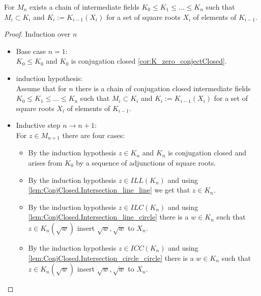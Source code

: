 \begin{lemma}
    \label{lem:Mi_chain}
    \leanok
    For $M_n$ exists a chain of intermediate fields $K_0 \le K_1 \le \ldots \le K_n$ such that $M_i\subset K_i$ and $K_i:= K_{i-1}(X_i)$ for a set of square roots $X_i$ of elements of $K_{i-1}$.
\end{lemma}

\begin{proof}
    \leanok
    Induction over $n$
    \begin{itemize}
        \item Base case $n=1$: \\
            $K_0 \le K_0$ and $K_0$ is conjugation closed \ref{cor:K_zero_conjectClosed}.
        \item induction hypothesis: \\
            Assume that for $n$ there is a chain of conjugation closed  intermediate fields $K_0 \le K_1 \le \ldots \le K_n$ such that $M_i\subset K_i$ and $K_i:= K_{i-1}(X_i)$ for a set of square roots $X_i$ of elements of $K_{i-1}$.
        \item Inductive step $n \to n+1$: \\
            For $z\in M_{n+1}$ there are four cases: 
            \begin{itemize}
                \item [$z \in M_n$:] By the induction hypothesis $z \in K_n$ and $K_n$ is conjugation closed and arises from $K_0$ by a sequence of adjunctions of square roots.
                \item [$z \in ILL (M_n)$:] By the induction hypothesis $z \in ILL (K_n)$ and using \ref{lem:ConjClosed.Intersection_line_line} we get that $z \in K_{n}$.
                \item [$z \in ILC (M_n)$:] By the induction hypothesis $z \in ILC (K_n)$ and using \ref{lem:ConjClosed.Intersection_line_circle} there is a $w \in K_n$ such that $z \in K_n(\sqrt{w})$ insert  $\sqrt{w}, \overline{\sqrt{w}}$ to $X_n$.
                \item [$z \in ICC (M_n)$:] By the induction hypothesis $z \in ICC (K_n)$ and using \ref{lem:ConjClosed.Intersection_circle_circle} there is a $w \in K_n$ such that $z \in K_n(\sqrt{w})$ insert $\sqrt{w}, \overline{\sqrt{w}}$ to $X_n$.
            \end{itemize}
    \end{itemize}
\end{proof}

